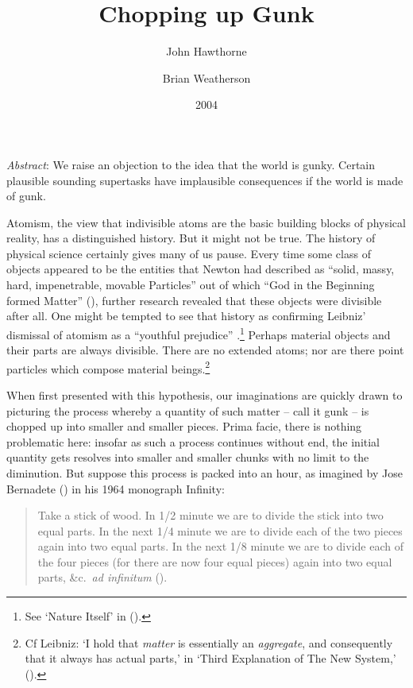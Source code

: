 \documentclass[
  11pt,
  letterpaper,
  DIV=11,
  numbers=noendperiod,
  twoside]{scrartcl}
\title{Chopping up Gunk}
\author{John Hawthorne \and Brian Weatherson}
\date{2004}
\renewenvironment{abstract}
 {\vspace{-1.25cm}
 \quotation\small\noindent\emph{Abstract}:}
 {\endquotation}
\renewenvironment{abstract}
 {\quotation\small\noindent\emph{Abstract}:}
 {\endquotation\vspace{-0.02cm}}
\begin{document}
\maketitle
\begin{abstract}
We raise an objection to the idea that the world is gunky. Certain
plausible sounding supertasks have implausible consequences if the world
is made of gunk.
\end{abstract}


Atomism, the view that indivisible atoms are the basic building blocks
of physical reality, has a distinguished history. But it might not be
true. The history of physical science certainly gives many of us pause.
Every time some class of objects appeared to be the entities that Newton
had described as ``solid, massy, hard, impenetrable, movable Particles''
out of which ``God in the Beginning formed Matter''
(), further research revealed
that these objects were divisible after all. One might be tempted to see
that history as confirming Leibniz' dismissal of atomism as a ``youthful
prejudice'' .\footnote{See `Nature Itself' in
  ().} Perhaps material
objects and their parts are always divisible. There are no extended
atoms; nor are there point particles which compose material
beings.\footnote{Cf Leibniz: `I hold that \emph{matter} is essentially
  an \emph{aggregate}, and consequently that it always has actual
  parts,' in `Third Explanation of The New System,'
  ().}

When first presented with this hypothesis, our imaginations are quickly
drawn to picturing the process whereby a quantity of such matter -- call
it gunk -- is chopped up into smaller and smaller pieces. Prima facie,
there is nothing problematic here: insofar as such a process continues
without end, the initial quantity gets resolves into smaller and smaller
chunks with no limit to the diminution. But suppose this process is
packed into an hour, as imagined by Jose Bernadete
() in his 1964 monograph Infinity:

\begin{quote}
Take a stick of wood. In 1/2 minute we are to divide the stick into two
equal parts. In the next 1/4 minute we are to divide each of the two
pieces again into two equal parts. In the next 1/8 minute we are to
divide each of the four pieces (for there are now four equal pieces)
again into two equal parts, \&c.~\emph{ad infinitum}
().
\end{quote}
\end{document}
